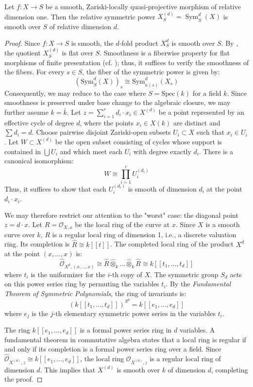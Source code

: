 \begin{prop}\label{prop:relative_symmetric_power_smooth}
Let $f:X\to S$ be a smooth, Zariski-locally quasi-projective morphism of
relative dimension one. Then the relative symmetric power
$X_S^{(d)}=\operatorname{Sym}_S^d(X)$ is smooth over $S$ of relative dimension
$d$.
\end{prop}

\begin{proof}Since $f: X \to S$ is smooth, the $d$-fold product $X_S^d$ is smooth over $S$. By , the quotient $X_S^{(d)}$ is flat over $S$. Smoothness is a fiberwise property for flat morphisms of finite presentation (cf. ); thus, it suffices to verify the smoothness of the fibers.
    For every $s \in S$, the fiber of the symmetric power is given by:$$(\text{Sym}^d_S(X))_s \cong \text{Sym}^d_{\kappa(s)}(X_s)$$Consequently, we may reduce to the case where $S = \text{Spec}(k)$ for a field $k$.
    Since smoothness is preserved under base change to the algebraic closure, we may further assume $k = \bar{k}$.
    Let $z = \sum_{i=1}^{r} d_i \cdot x_i \in X^{(d)}$ be a point represented by an effective cycle of degree $d$, where the points $x_i \in X(k)$ are distinct and $\sum d_i = d$. Choose pairwise disjoint Zariski-open subsets $U_i \subset X$ such that $x_i \in U_i$. Let $W \subset X^{(d)}$ be the open subset consisting of cycles whose support is contained in $\bigcup U_i$ and which meet each $U_i$ with degree exactly $d_i$. There is a canonical isomorphism:
$$W \cong \prod_{i=1}^r U_i^{(d_i)}$$
Thus, it suffices to show that each $U_i^{(d_i)}$ is smooth of dimension $d_i$ at the point $d_i \cdot x_i$.

We may therefore restrict our attention to the "worst" case: the diagonal point $z = d \cdot x$. Let $R = \mathcal{O}_{X,x}$ be the local ring of the curve at $x$. Since $X$ is a smooth curve over $k$, $R$ is a regular local ring of dimension 1, i.e., a discrete valuation ring. Its completion is $\hat{R} \cong k[[t]]$. The completed local ring of the product $X^d$ at the point $(x, \dots, x)$ is:
$$\hat{\mathcal{O}}_{X^d, (x, \dots, x)} \cong \hat{R} \hat{\otimes}_k \dots \hat{\otimes}_k \hat{R} \cong k[[t_1, \dots, t_d]]$$
where $t_i$ is the uniformizer for the $i$-th copy of $X$. The symmetric group $S_d$ acts on this power series ring by permuting the variables
$t_i$. By the \textit{Fundamental Theorem of Symmetric Polynomials}, the ring of invariants is:
$$\left( k[[t_1, \dots, t_d]] \right)^{S^d} = k[[e_1, \dots, e_d]]$$
where $e_j$ is the $j$-th elementary symmetric power series in the variables $t_i$.

The ring $k[[e_1, \dots, e_d]]$ is a formal power series ring in $d$ variables. A fundamental theorem in commutative algebra states that a local ring is regular if and only if its completion is a formal power series ring over a field. Since $\hat{\mathcal{O}}_{X^{(d)}, z} \cong k[[e_1, \dots, e_d]]$, the local ring $\mathcal{O}_{X^{(d)}, z}$ is a regular local ring of dimension $d$. This implies that $X^{(d)}$ is smooth over $k$ of dimension $d$, completing the proof.
\end{proof}


